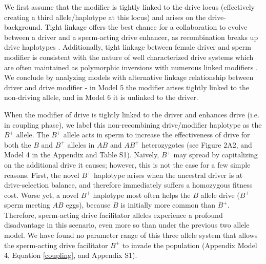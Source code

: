 \documentclass{pnastwo}
\begin{document}
\begin{article}
We first assume that the modifier is tightly
        linked to the drive locus (effectively creating a third
        allele/haplotype at this locus) and arises on the drive-background. 
Tight linkage offers the best
        chance for a collaboration to evolve between a driver and
       a sperm-acting drive  enhancer, as recombination breaks up drive haplotypes \cite{Thomson1974,Charlesworth1978,Haig1991}. 
Additionally, tight linkage between female driver and sperm modifier is consistent with the nature of well characterized drive systems which are often maintained as polymorphic inversions with numerous linked modifiers \cite{Burt2006}. 
We conclude by analyzing models with alternative linkage relationship between driver and drive modifier - 
	in Model 5 the modifier arises tightly linked to the non-driving allele, 
	and in Model 6 it is unlinked to the driver. 


When the modifier of drive is tightly linked to the driver and
enhances drive (i.e. in coupling phase), 
	we label  this non-recombining drive/modifier haplotype as the $B^+$ allele.  
The $B^+$ allele acts in sperm to increase the effectiveness of drive for both
	the $B$ and  $B^{+}$ alleles in $AB$ and $AB^{+}$ heterozygotes (see Figure 2A2, and Model 4 in the Appendix and Table S1). 
Naively, $B^{+}$ may spread by capitalizing on the additional drive it causes; however,  
	this is not the case for a few simple reasons. 
First, the novel $B^{+}$ haplotype
	arises when the ancestral driver 
	is at drive-selection balance, 
	and therefore immediately suffers a homozygous fitness cost.  
Worse yet, a novel $B^{+}$ haplotype most often helps 
	the $B$  allele drive ($B^+$ sperm meeting $AB$ eggs), because $B$ is initially more common than $B^{+}$. 
Therefore, sperm-acting drive facilitator alleles experience a profound disadvantage 
	in this scenario, even more so than under the previous two allele model. 
We have found no parameter range of this
	three allele system that allows the sperm-acting drive facilitator $B^{+}$ to
	invade the population (Appendix Model 4, Equation \eqref{coupling}, and Appendix S1). 


\end{article}
\end{document}
